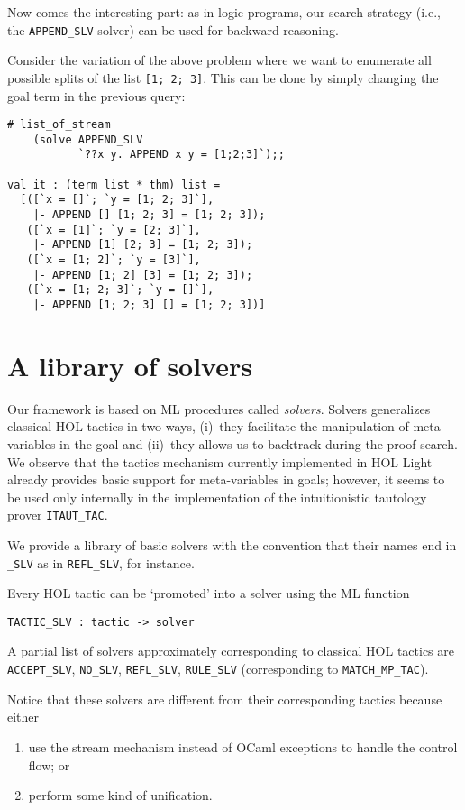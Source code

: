 Now comes the interesting part: as in logic programs, our search
strategy (i.e., the \verb|APPEND_SLV| solver) can be used for backward
reasoning.

Consider the variation of the above problem where we want to enumerate
all possible splits of the list \verb|[1; 2; 3]|.  This can be done by
simply changing the goal term in the previous query:
\begin{verbatim}
# list_of_stream
    (solve APPEND_SLV
           `??x y. APPEND x y = [1;2;3]`);;

val it : (term list * thm) list =
  [([`x = []`; `y = [1; 2; 3]`],
    |- APPEND [] [1; 2; 3] = [1; 2; 3]);
   ([`x = [1]`; `y = [2; 3]`],
    |- APPEND [1] [2; 3] = [1; 2; 3]);
   ([`x = [1; 2]`; `y = [3]`],
    |- APPEND [1; 2] [3] = [1; 2; 3]);
   ([`x = [1; 2; 3]`; `y = []`],
    |- APPEND [1; 2; 3] [] = [1; 2; 3])]
\end{verbatim}

\section{A library of solvers}
\label{sec:library-solvers}

Our framework is based on ML procedures called \emph{solvers}.  Solvers
generalizes classical HOL tactics in two ways, (i)~they facilitate the
manipulation of meta-variables in the goal and (ii)~they allows us to backtrack
during the proof search. We observe that the tactics mechanism currently
implemented in HOL Light already provides basic support for meta-variables in
goals; however, it seems to be used only internally in the implementation of
the intuitionistic tautology prover \texttt{ITAUT\_TAC}.

We provide a library of basic solvers with the convention that their names end
in \verb|_SLV| as in \verb|REFL_SLV|, for instance.

Every HOL tactic can be `promoted' into a solver using the ML function
\begin{verbatim}
TACTIC_SLV : tactic -> solver
\end{verbatim}
A partial list of solvers approximately corresponding to classical HOL
tactics are \verb|ACCEPT_SLV|, \verb|NO_SLV|, \verb|REFL_SLV|,
\verb|RULE_SLV| (corresponding to \verb|MATCH_MP_TAC|).

Notice that these solvers are different from their corresponding
tactics because either
\begin{enumerate}
\item use the stream mechanism instead of OCaml exceptions to
  handle the control flow; or
\item perform some kind of unification.
\end{enumerate}

